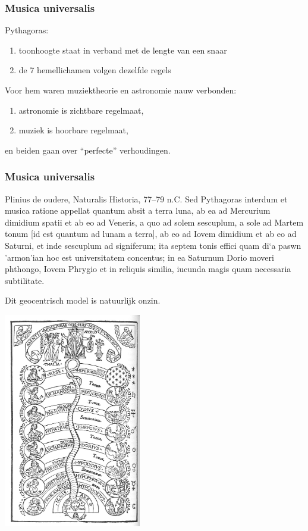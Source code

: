 \documentclass[compress, darktitle, framenumber, totalframenumber, handout]{beamer}
\begin{document}
\begin{frame}[label=history]
  \frametitle{Musica universalis}

  Pythagoras:
  \begin{enumerate}
    \item toonhoogte staat in verband met de lengte van een snaar
    \item de 7 hemellichamen volgen dezelfde regels
  \end{enumerate}

  \pause
  Voor hem waren muziektheorie en astronomie nauw verbonden:
  \begin{enumerate}
    \item astronomie is \alert{zichtbare} regelmaat,
    \item muziek is \alert{hoorbare} regelmaat,
  \end{enumerate}
  en beiden gaan over \alert{``perfecte'' verhoudingen}.
\end{frame}

\begin{frame}
  \frametitle{Musica universalis}

  \begin{block}{Plinius de oudere, Naturalis Historia, 77--79 n.C.}
    Sed Pythagoras interdum et musica ratione appellat quantum absit a terra luna, ab ea ad Mercurium dimidium spatii et ab eo ad Veneris, a quo ad solem sescuplum, a sole ad Martem tonum [id est quantum ad lunam a terra], ab eo ad Iovem dimidium et ab eo ad Saturni, et inde sescuplum ad signiferum; ita septem tonis effici quam \greektext di`a paswn 'armon'ian \latintext hoc est universitatem concentus; in ea Saturnum Dorio moveri phthongo, Iovem Phrygio et in reliquis similia, iucunda magis quam necessaria subtilitate.
  \end{block}

  \pause

  Dit \alert{geocentrisch model} is natuurlijk onzin.
\end{frame}

\begin{frame}[plain]
  \centering
  \includegraphics[width=6cm]{images/spheres}
\end{frame}
\end{document}
